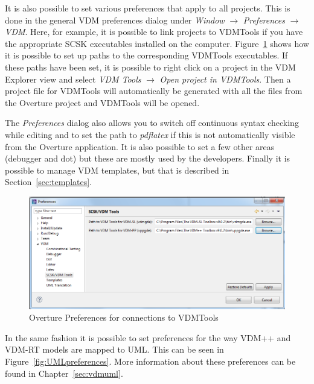\documentclass{overturerepchap}
\begin{document}
It is also possible to set various preferences that apply to
all projects. This is done in the general VDM preferences dialog under
\emph{Window} $\rightarrow$ \emph{Preferences} $\rightarrow$
\emph{VDM}. Here, for example, it is possible to link projects to
VDMTools if you have the appropriate SCSK executables installed on
the computer. Figure~\ref{fig:SCSKPreferences} shows how it is possible to
set up paths to the corresponding VDMTools executables. If these paths have
been set, it is possible to right click on a project in the VDM
Explorer view and select \emph{VDM Tools} $\rightarrow$
\emph{Open project in VDMTools}. Then a project file for VDMTools
will automatically be generated with all the files from the Overture project
and VDMTools will be opened. 

The \emph{Preferences} dialog also
allows you to switch off continuous syntax checking while editing and
to set the path to \emph{pdflatex} if this is not automatically
visible from the Overture application. It is also possible to set a few
other areas (debugger and dot) but these are mostly used by the developers.
Finally it is possible to
manage VDM templates, but that is described in Section~\ref{sec:templates}.

\begin{figure}[!hbt]
\begin{center}
  \includegraphics[width=\textwidth]{screenDumps/CSKPreferences}
  \caption{Overture Preferences for connections to VDMTools}
  \label{fig:SCSKPreferences}
\end{center}
\end{figure}

In the same fashion it is possible to set preferences for the way VDM++ and VDM-RT models are mapped to UML. 
This can be seen in Figure~\ref{fig:UMLpreferences}. More information about 
these preferences can be found in Chapter~\ref{sec:vdmuml}.
\end{document}
